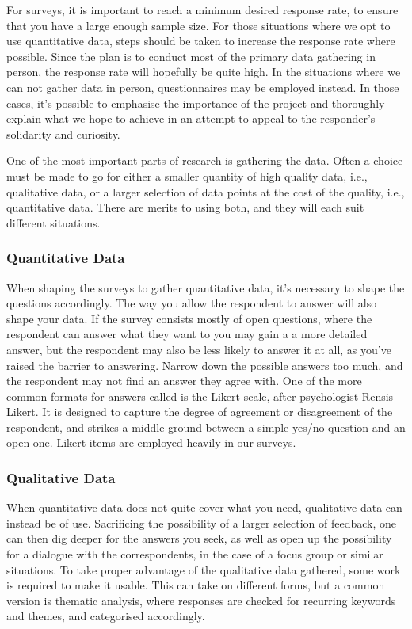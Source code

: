 For surveys, it is important to reach a minimum desired response rate, to ensure that you have a large enough sample size. For those situations where we opt to use quantitative data, steps should be taken to increase the response rate where possible. Since the plan is to conduct most of the primary data gathering in person, the response rate will hopefully be quite high. In the situations where we can not gather data in person, questionnaires may be employed instead. In those cases, it's possible to emphasise the importance of the project and thoroughly explain what we hope to achieve in an attempt to appeal to the responder's solidarity and curiosity. 

One of the most important parts of research is gathering the data. Often a choice must be made to go for either a smaller quantity of high quality data, i.e., qualitative data, or a larger selection of data points at the cost of the quality, i.e., quantitative data. There are merits to using both, and they will each suit different situations.

\subsubsection{Quantitative Data}
When shaping the surveys to gather quantitative data, it's necessary to shape the questions accordingly. The way you allow the respondent to answer will also shape your data. If the survey consists mostly of open questions, where the respondent can answer what they want to you may gain a a more detailed answer, but the respondent may also be less likely to answer it at all, as you've raised the barrier to answering\citep[p.~223]{oates2005researching}. Narrow down the possible answers too much, and the respondent may not find an answer they agree with. One of the more common formats for answers called is the Likert scale, after psychologist Rensis Likert\cite{likert1932technique}. It is designed to capture the degree of agreement or disagreement of the respondent, and strikes a middle ground between a simple yes/no question and an open one. Likert items are employed heavily in our surveys.


\subsubsection{Qualitative Data}
When quantitative data does not quite cover what you need, qualitative data can instead be of use. Sacrificing the possibility of a larger selection of feedback, one can then dig deeper for the answers you seek, as well as open up the possibility for a dialogue with the correspondents, in the case of a focus group or similar situations. To take proper advantage of the qualitative data gathered, some work is required to make it usable. This can take on different forms, but a common version is thematic analysis, where responses are checked for recurring keywords and themes, and categorised accordingly.

